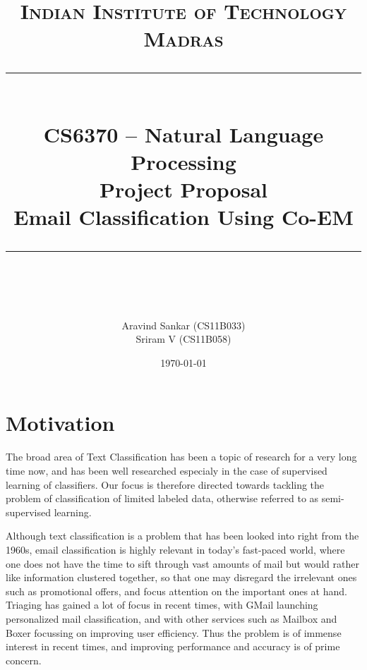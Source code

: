 

\newcommand{\horrule}[1]{\rule{\linewidth}{#1}} %

\title{	
\normalfont \normalsize 
\textsc{Indian Institute of Technology Madras} \\ [25pt] %
\horrule{0.5pt} \\[0.4cm] %
\huge CS6370 -- Natural Language Processing \\ Project Proposal \\ Email Classification Using Co-EM %
\horrule{2pt} \\[0.5cm] %
}
\author{\large Aravind Sankar (CS11B033) \\ \large Sriram V (CS11B058)} %

\date{\normalsize\today} %



\maketitle
\thispagestyle{empty}

\section{Motivation}

The broad area of Text Classification has been a topic of research for a very long time now, and has been well researched especialy in the case of supervised learning of classifiers. Our focus is therefore directed towards tackling the problem of classification of limited labeled data, otherwise referred to as semi-supervised learning.

Although text classification is a problem that has been looked into right from the 1960s, email classification is highly relevant in today's fast-paced world, where one does not have the time to sift through vast amounts of mail but would rather like information clustered together, so that one may disregard the irrelevant ones such as promotional offers, and focus attention on the important ones at hand. Triaging has gained a lot of focus in recent times, with GMail launching personalized mail classification, and with other services such as Mailbox and Boxer focussing on improving user efficiency. Thus the problem is of immense interest in recent times, and improving performance and accuracy is of prime concern.

